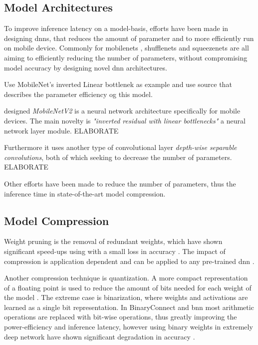 \subsection{Model Architectures}

To improve inference latency on a model-basis, efforts have been made in designing \gls{dnn}s, that reduces the amount of parameter and to more efficiently run on mobile device. Commonly for \gls{mobilenet}s \cite{howard_mobilenets:_2017,sandler_mobilenetv2:_2018}, \gls{shufflenet}s \cite{zhang_shufflenet:_2017, ma_shufflenet_2018} and \gls{squeezenet}s \cite{iandola_squeezenet:_2016} are all aiming to efficiently reducing the number of parameters, without compromising model accuracy by designing novel \gls{dnn} architectures.

Use MobileNet's inverted Linear bottlenek as example and use source that describes the parameter efficiency og this model. 

\citeauthor{sandler_mobilenetv2:_2018} designed \textsl{MobileNetV2} is a neural network architecture specifically for mobile devices. The main novelty is \textit{"inverted residual with linear bottlenecks"} a neural network layer module. ELABORATE

Furthermore it uses another type of convolutional layer \textit{depth-wise separable convolutions}, both of which seeking to decrease the number of parameters. ELABORATE

Other efforts have been made to reduce the number of parameters, thus the inference time in state-of-the-art model compression. 

\subsection{Model Compression}

Weight pruning is the removal of redundant weights, which have shown significant speed-ups using with a small loss in accuracy \cite{zhou_edge_2019}. The impact of compression is application dependent and can be applied to any pre-trained \gls{dnn} \cite{cheng_survey_2017}.

Another compression technique is quantization. A more compact representation of a floating point is used to reduce the amount of bits needed for each weight of the model \cite{cheng_survey_2017}. The extreme case is binarization, where weights and activations are learned as a single bit representation. In BinaryConnect \cite{courbariaux_binaryconnect:_2015} and \gls{bnn} \cite{courbariaux_binarized_2016} most arithmetic operations are replaced with bit-wise operations, thus greatly improving the power-efficiency and inference latency, however using binary weights in extremely deep network have shown significant degradation in accuracy \cite{cheng_survey_2017}.

